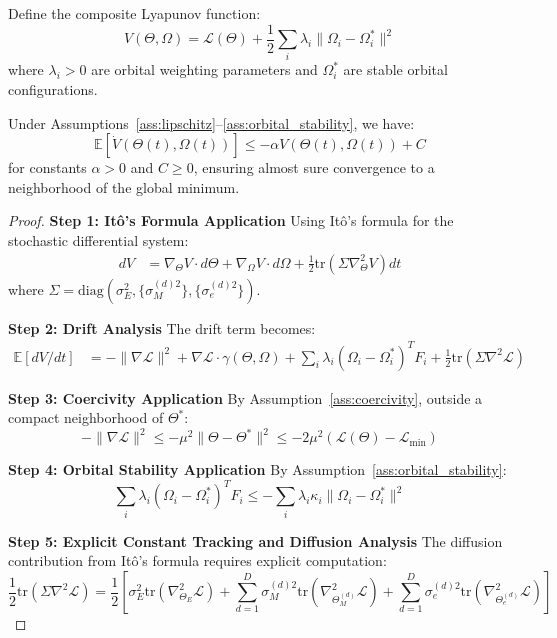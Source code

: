 \begin{theorem}
\label{thm:hierarchical_lyapunov}
Define the composite Lyapunov function:
$$V(\Theta, \Omega) = \mathcal{L}(\Theta) + \frac{1}{2}\sum_{i} \lambda_i \|\Omega_i - \Omega_i^*\|^2$$
where $\lambda_i > 0$ are orbital weighting parameters and $\Omega_i^*$ are stable orbital configurations.

Under Assumptions~\ref{ass:lipschitz}--\ref{ass:orbital_stability}, we have:
$$\mathbb{E}[\dot{V}(\Theta(t), \Omega(t))] \leq -\alpha V(\Theta(t), \Omega(t)) + C$$
for constants $\alpha > 0$ and $C \geq 0$, ensuring almost sure convergence to a neighborhood of the global minimum.
\end{theorem}

\begin{proof}
\textbf{Step 1: Itô's Formula Application}
Using Itô's formula for the stochastic differential system:
\begin{align}
d V &= \nabla_\Theta V \cdot d\Theta + \nabla_\Omega V \cdot d\Omega + \frac{1}{2} \text{tr}(\Sigma \nabla_\Theta^2 V) dt
\end{align}
where $\Sigma = \text{diag}(\sigma_E^2, \{\sigma_M^{(d)2}\}, \{\sigma_e^{(d)2}\})$.

\textbf{Step 2: Drift Analysis}
The drift term becomes:
\begin{align}
\mathbb{E}[dV/dt] &= -\|\nabla \mathcal{L}\|^2 + \nabla \mathcal{L} \cdot \gamma(\Theta, \Omega) + \sum_i \lambda_i (\Omega_i - \Omega_i^*)^T F_i + \frac{1}{2}\text{tr}(\Sigma \nabla^2 \mathcal{L})
\end{align}

\textbf{Step 3: Coercivity Application}
By Assumption~\ref{ass:coercivity}, outside a compact neighborhood of $\Theta^*$:
$$-\|\nabla \mathcal{L}\|^2 \leq -\mu^2 \|\Theta - \Theta^*\|^2 \leq -2\mu^2 (\mathcal{L}(\Theta) - \mathcal{L}_{\text{min}})$$

\textbf{Step 4: Orbital Stability Application}  
By Assumption~\ref{ass:orbital_stability}:
$$\sum_i \lambda_i (\Omega_i - \Omega_i^*)^T F_i \leq -\sum_i \lambda_i \kappa_i \|\Omega_i - \Omega_i^*\|^2$$

\textbf{Step 5: Explicit Constant Tracking and Diffusion Analysis}
The diffusion contribution from Itô's formula requires explicit computation:
$$\frac{1}{2}\text{tr}(\Sigma \nabla^2 \mathcal{L}) = \frac{1}{2}\left[\sigma_E^2 \text{tr}(\nabla_{\Theta_E}^2 \mathcal{L}) + \sum_{d=1}^D \sigma_M^{(d)2} \text{tr}(\nabla_{\Theta_M^{(d)}}^2 \mathcal{L}) + \sum_{d=1}^D \sigma_e^{(d)2} \text{tr}(\nabla_{\Theta_e^{(d)}}^2 \mathcal{L})\right]$$


\end{proof}
